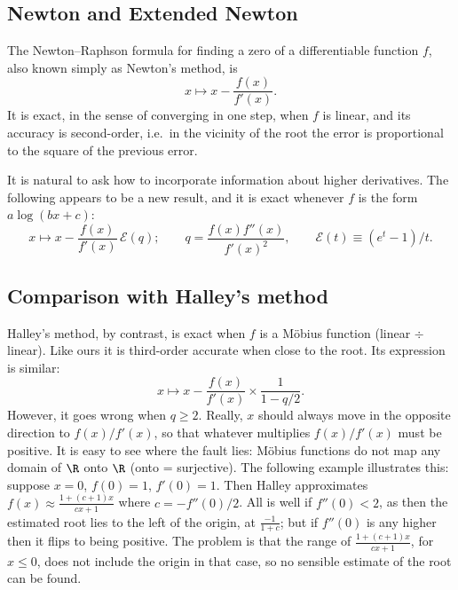 \subsection{Newton and Extended Newton}

The Newton--Raphson formula \cite[\S9.4]{NRC} for finding a zero of a differentiable function $f$, also known simply as Newton's method, is
\begin{equation}
x \mapsto x - \frac{f(x)}{f'(x)}.
\label{eq:NR}
\end{equation}
It is exact, in the sense of converging in one step, when $f$ is linear, and its accuracy is second-order, i.e.\ in the vicinity of the root the error is proportional to the square of the previous error.

It is natural to ask how to incorporate information about higher derivatives. The following appears to be a new result, and it is exact whenever $f$ is the form $a\log(bx+c)$:
\begin{equation}
x \mapsto x - \frac{f(x)}{f'(x)} \, \mathcal{E}(q) ;
\qquad
q = \frac{f(x)f''(x)}{f'(x)^2},
\qquad
\mathcal{E}(t)\equiv (e^t-1)/t.
\label{eq:HNR1}
\end{equation}

\subsection{Comparison with Halley's method}

Halley's method, by contrast, is exact when $f$ is a M\"obius function (linear $\div$ linear).
Like ours it is third-order accurate when close to the root.
Its expression is similar:
\begin{equation}
x \mapsto x - \frac{f(x)}{f'(x)} \times \frac{1}{1-q/2} .
\end{equation}
However, it goes wrong when $q\ge2$.  Really, $x$ should always move in the opposite direction to $f(x)/f'(x)$, so that whatever multiplies $f(x)/f'(x)$ must be positive. It is easy to see where the fault lies: M\"obius functions do not map any domain of $\R$ onto $\R$ (onto = surjective).
The following example illustrates this: suppose $x=0$, $f(0)=1$, $f'(0)=1$. Then Halley approximates $f(x)\approx \frac{1+(c+1)x}{cx+1}$ where $c=-f''(0)/2$. All is well if $f''(0)<2$, as then the estimated root lies to the left of the origin, at $\frac{-1}{1+c}$; but if $f''(0)$ is any higher then it flips to being positive. The problem is that the range of $\frac{1+(c+1)x}{cx+1}$, for $x\le0$, does not include the origin in that case, so no sensible estimate of the root can be found.


